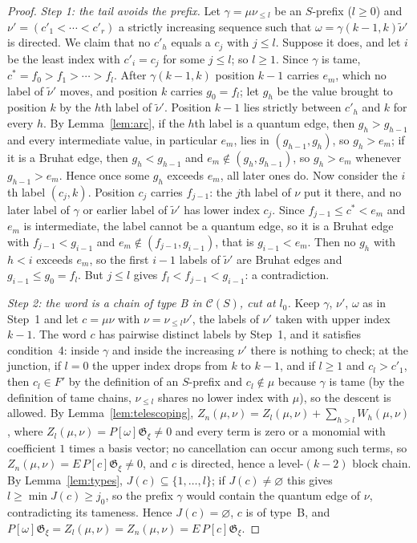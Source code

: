 \documentclass[11pt]{article}
\newcommand{\G}{\mathfrak{G}}
\begin{document}
\begin{proof}
\emph{Step 1: the tail avoids the prefix.} Let $\gamma=\mu\nu_{\leq l}$
be an $S$-prefix ($l\geq0$) and $\nu'=(c'_1<\cdots<c'_r)$ a strictly
increasing sequence such that $\omega=\gamma(k-1,k)\tilde\nu'$ is
directed. We claim that no $c'_h$ equals a $c_j$ with $j\leq l$.
Suppose it does, and let $i$ be the least index with $c'_i=c_j$ for
some $j\leq l$; so $l\geq1$. Since $\gamma$ is tame,
$c^\ast=f_0>f_1>\cdots>f_l$. After $\gamma(k-1,k)$ position $k-1$
carries $e_m$, which no label of $\tilde\nu'$ moves, and position $k$
carries $g_0=f_l$; let $g_h$ be the value brought to position $k$ by
the $h$th label of $\tilde\nu'$. Position $k-1$ lies strictly between
$c'_h$ and $k$ for every $h$. By Lemma~\ref{lem:arc}, if the $h$th
label is a quantum edge, then $g_h>g_{h-1}$ and every intermediate
value, in particular $e_m$, lies in $(g_{h-1},g_h)$, so $g_h>e_m$; if
it is a Bruhat edge, then $g_h<g_{h-1}$ and $e_m\notin(g_h,g_{h-1})$,
so $g_h>e_m$ whenever $g_{h-1}>e_m$. Hence once some $g_h$ exceeds
$e_m$, all later ones do. Now consider the $i$th label $(c_j,k)$.
Position $c_j$ carries $f_{j-1}$: the $j$th label of $\nu$ put it
there, and no later label of $\gamma$ or earlier label of $\tilde\nu'$
has lower index $c_j$. Since $f_{j-1}\leq c^\ast<e_m$ and $e_m$ is
intermediate, the label cannot be a quantum edge, so it is a Bruhat
edge with $f_{j-1}<g_{i-1}$ and $e_m\notin(f_{j-1},g_{i-1})$, that is
$g_{i-1}<e_m$. Then no $g_h$ with $h<i$ exceeds $e_m$, so the first
$i-1$ labels of $\tilde\nu'$ are Bruhat edges and
$g_{i-1}\leq g_0=f_l$. But $j\leq l$ gives $f_l<f_{j-1}<g_{i-1}$: a
contradiction.

\emph{Step 2: the word is a chain of type B in $\mathcal C(S)$, cut at
$l_0$.} Keep $\gamma$, $\nu'$, $\omega$ as in Step~1 and let
$c=\mu\nu$ with $\nu=\nu_{\leq l}\nu'$, the labels of $\nu'$ taken
with upper index $k-1$. The word $c$ has pairwise distinct labels by
Step~1, and it satisfies condition~4: inside $\gamma$ and inside the
increasing $\nu'$ there is nothing to check; at the junction, if $l=0$
the upper index drops from $k$ to $k-1$, and if $l\geq1$ and
$c_l>c'_1$, then $c_l\in F'$ by the definition of an $S$-prefix and
$c_l\notin\mu$ because $\gamma$ is tame (by the definition of tame
chains, $\nu_{\leq l}$ shares no lower index with $\mu$), so the
descent is allowed. By Lemma~\ref{lem:telescoping},
$Z_n(\mu,\nu)=Z_l(\mu,\nu)+\sum_{h>l}W_h(\mu,\nu)$, where
$Z_l(\mu,\nu)=P[\omega]\G_\xi\neq0$ and every term is zero or a
monomial with coefficient $1$ times a basis vector; no cancellation
can occur among such terms, so
$Z_n(\mu,\nu)=E\,P[c]\G_\xi\neq0$, and $c$ is directed, hence a
level-$(k-2)$ block chain. By Lemma~\ref{lem:types},
$J(c)\subseteq\{1,\ldots,l\}$; if $J(c)\neq\varnothing$ this gives
$l\geq\min J(c)\geq j_0$, so the prefix $\gamma$ would contain the
quantum edge of $\nu$, contradicting its tameness. Hence
$J(c)=\varnothing$, $c$ is of type~B, and
$P[\omega]\G_\xi=Z_l(\mu,\nu)=Z_n(\mu,\nu)=E\,P[c]\G_\xi$.


\end{proof}
\end{document}
